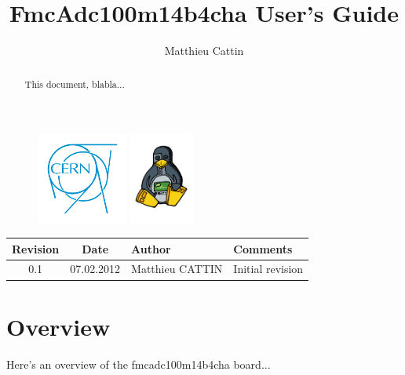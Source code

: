 \documentclass[11pt,a4paper]{article}
\title{FmcAdc100m14b4cha User's Guide}
\author{Matthieu Cattin}
\begin{document}
\begin{figure}[t]
  \includegraphics[height=3cm]{figures/cern_logo.pdf}
  \label{fig:cern_logo}
  \hfill
  \includegraphics[height=3cm]{figures/ohr_logo.pdf}
  \label{fig:ohr_logo}
\end{figure}

\maketitle

\begin{abstract}
This document, blabla...
\end{abstract}


\newpage
\begin{tabularx}{1.0\textwidth}{| c | c | l | X |}
\hline
Revision & Date & Author &  Comments\\
\hline
0.1 & 07.02.2012 & Matthieu CATTIN & Initial revision\\
\hline
\end{tabularx}

\newpage
\tableofcontents

\newpage

\section{Overview}
Here's an overview of the fmcadc100m14b4cha board...
\end{document}

